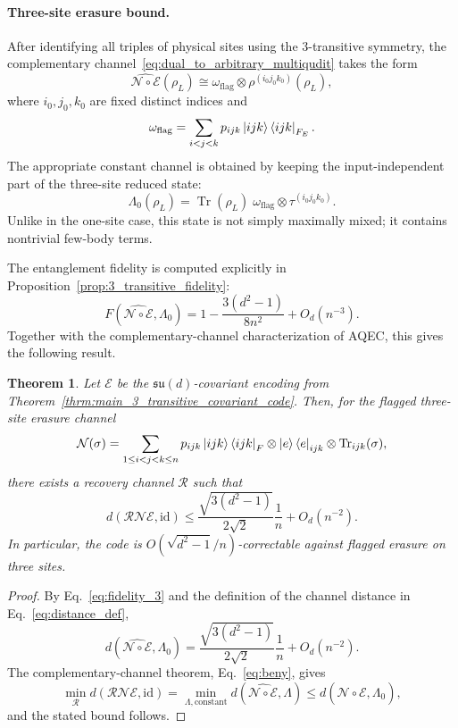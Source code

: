 \documentclass[10pt,twocolumn,superscriptaddress,aps,amsmath,amssymb,citeautoscript,floatfix,prx]{revtex4-2}
\newtheorem{theorem}{Theorem}
\theoremstyle{plain}
\theoremstyle{plain}
\theoremstyle{plain}
\theoremstyle{plain}
\theoremstyle{plain}
\theoremstyle{plain}
\theoremstyle{plain}
\theoremstyle{definition}
\theoremstyle{plain}
\begin{document}
\paragraph{Three-site erasure bound.}

After identifying all triples of physical sites using the $3$-transitive symmetry, the complementary channel~\eqref{eq:dual_to_arbitrary_multiqudit} takes the form
$$
\widehat{\mathcal N\circ\mathcal E}(\rho_L)
\cong
\omega_{\mathrm{flag}}
\otimes
\rho^{(i_0j_0k_0)}(\rho_L),
$$
where $i_0,j_0,k_0$ are fixed distinct indices and
$$
\omega_{\mathrm{flag}}
=
\sum_{i<j<k}
p_{ijk}
\ket{ijk}\bra{ijk}_{F_E}.
$$
The appropriate constant channel is obtained by keeping the input-independent part of the three-site reduced state:
$$
\Lambda_0(\rho_L)
=
\operatorname{Tr}(\rho_L)\;
\omega_{\mathrm{flag}}
\otimes
\tau^{(i_0j_0k_0)} .
$$
Unlike in the one-site case, this state is not simply maximally mixed; it contains nontrivial few-body terms.

The entanglement fidelity is computed explicitly in Proposition~\ref{prop:3_transitive_fidelity}:
\begin{equation}\label{eq:fidelity_3}
F\left(\widehat{\mathcal N\circ\mathcal E},\Lambda_0\right)
=
1
-
\frac{3(d^2-1)}{8n^2}
+
O_{d}(n^{-3}) .
\end{equation}
Together with the complementary-channel characterization of AQEC, this gives the following result.

\begin{theorem}
Let $\mathcal E$ be the $\mathfrak{su}(d)$-covariant encoding from Theorem~\ref{thrm:main_3_transitive_covariant_code}. Then, for the flagged three-site erasure channel
$$
\mathcal N(\sigma)
=
\sum_{1\le i<j<k\le n}
p_{ijk}
\ket{ijk}\bra{ijk}_F
\otimes
\ket e\bra e_{ijk}
\otimes
\operatorname{Tr}_{ijk}(\sigma),
$$
there exists a recovery channel $\mathcal R$ such that
$$
d(\mathcal R\mathcal N\mathcal E,\mathrm{id})
\le
\frac{\sqrt{3(d^2-1)}}{2\sqrt 2}
\frac1n
+
O_{d}(n^{-2}) .
$$
In particular, the code is $O(\sqrt{d^2-1}/n)$-correctable against flagged erasure on three sites.
\end{theorem}

\begin{proof}
By Eq.~\eqref{eq:fidelity_3} and the definition of the channel distance in Eq.~\eqref{eq:distance_def},
$$
d\left(\widehat{\mathcal N\circ\mathcal E},\Lambda_0\right)
=
\frac{\sqrt{3(d^2-1)}}{2\sqrt 2}
\frac1n
+
O_{d}(n^{-2}) .
$$
The complementary-channel theorem, Eq.~\eqref{eq:beny}, gives
$$
\min_{\mathcal R}
d(\mathcal R\mathcal N\mathcal E,\mathrm{id})
=
\min_{\Lambda,\mathrm{constant}}
d\left(\widehat{\mathcal N\circ\mathcal E},\Lambda\right)
\le
d\left(\widehat{\mathcal N\circ\mathcal E},\Lambda_0\right),
$$
and the stated bound follows.
\end{proof}
\end{document}
